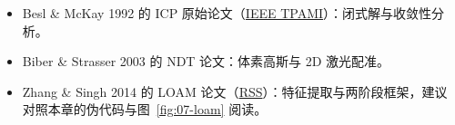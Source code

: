 \begin{reading}

\begin{itemize}
  \item Besl \& McKay 1992 的 ICP 原始论文（\href{https://ieeexplore.ieee.org/document/121791}{IEEE TPAMI}）：闭式解与收敛性分析。
  \item Biber \& Strasser 2003 的 NDT 论文：体素高斯与 2D 激光配准。
  \item Zhang \& Singh 2014 的 LOAM 论文（\href{https://www.ri.cmu.edu/pub_files/2014/7/Ji_LidarMapping_RSS2014_v8.pdf}{RSS}）：特征提取与两阶段框架，建议对照本章的伪代码与图~\ref{fig:07-loam} 阅读。
\end{itemize}


\end{reading}
